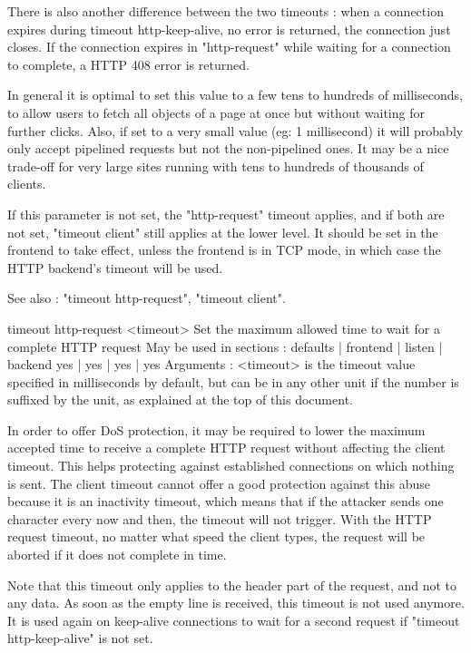   There is also another difference between the two timeouts : when a connection
  expires during timeout http-keep-alive, no error is returned, the connection
  just closes. If the connection expires in "http-request" while waiting for a
  connection to complete, a HTTP 408 error is returned.

  In general it is optimal to set this value to a few tens to hundreds of
  milliseconds, to allow users to fetch all objects of a page at once but
  without waiting for further clicks. Also, if set to a very small value (eg:
  1 millisecond) it will probably only accept pipelined requests but not the
  non-pipelined ones. It may be a nice trade-off for very large sites running
  with tens to hundreds of thousands of clients.

  If this parameter is not set, the "http-request" timeout applies, and if both
  are not set, "timeout client" still applies at the lower level. It should be
  set in the frontend to take effect, unless the frontend is in TCP mode, in
  which case the HTTP backend's timeout will be used.

  See also : "timeout http-request", "timeout client".


timeout http-request <timeout>
  Set the maximum allowed time to wait for a complete HTTP request
  May be used in sections :   defaults | frontend | listen | backend
                                 yes   |    yes   |   yes  |   yes
  Arguments :
    <timeout> is the timeout value specified in milliseconds by default, but
              can be in any other unit if the number is suffixed by the unit,
              as explained at the top of this document.

  In order to offer DoS protection, it may be required to lower the maximum
  accepted time to receive a complete HTTP request without affecting the client
  timeout. This helps protecting against established connections on which
  nothing is sent. The client timeout cannot offer a good protection against
  this abuse because it is an inactivity timeout, which means that if the
  attacker sends one character every now and then, the timeout will not
  trigger. With the HTTP request timeout, no matter what speed the client
  types, the request will be aborted if it does not complete in time.

  Note that this timeout only applies to the header part of the request, and
  not to any data. As soon as the empty line is received, this timeout is not
  used anymore. It is used again on keep-alive connections to wait for a second
  request if "timeout http-keep-alive" is not set.

